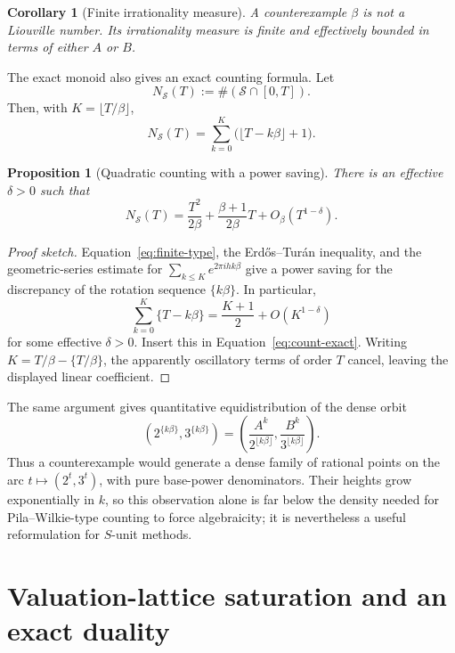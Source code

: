 \documentclass[11pt,oneside]{article}
\newtheorem{proposition}[theorem]{Proposition}
\newtheorem{corollary}[theorem]{Corollary}
\theoremstyle{definition}
\theoremstyle{remark}
\begin{document}
\begin{corollary}[Finite irrationality measure]\label{cor:finite-mu}
A counterexample $\beta$ is not a Liouville number.  Its irrationality measure
is finite and effectively bounded in terms of either $A$ or $B$.
\end{corollary}

The exact monoid also gives an exact counting formula.  Let
\[
  N_{\mathcal S}(T):=\#(\mathcal S\cap[0,T]).
\]
Then, with $K=\lfloor T/\beta\rfloor$,
\begin{equation}\label{eq:count-exact}
 N_{\mathcal S}(T)=\sum_{k=0}^{K}\bigl(\lfloor T-k\beta\rfloor+1\bigr).
\end{equation}

\begin{proposition}[Quadratic counting with a power saving]\label{prop:count}
There is an effective $\delta>0$ such that
\[
 N_{\mathcal S}(T)=\frac{T^2}{2\beta}
 +\frac{\beta+1}{2\beta}T+O_\beta(T^{1-\delta}).
\]
\end{proposition}
\begin{proof}[Proof sketch]
Equation~\eqref{eq:finite-type}, the Erd\H{o}s--Tur\'an inequality, and the
geometric-series estimate for $\sum_{k\le K}e^{2\pi i h k\beta}$ give a power
saving for the discrepancy of the rotation sequence $\{k\beta\}$.  In
particular,
\[
 \sum_{k=0}^{K}\{T-k\beta\}=\frac{K+1}{2}+O(K^{1-\delta})
\]
for some effective $\delta>0$.  Insert this in
Equation~\eqref{eq:count-exact}.  Writing $K=T/\beta-\{T/\beta\}$, the
apparently oscillatory terms of order $T$ cancel, leaving the displayed linear
coefficient.
\end{proof}

The same argument gives quantitative equidistribution of the dense orbit
\[
 \left(2^{\{k\beta\}},3^{\{k\beta\}}\right)
 =\left(\frac{A^k}{2^{\lfloor k\beta\rfloor}},
         \frac{B^k}{3^{\lfloor k\beta\rfloor}}\right).
\]
Thus a counterexample would generate a dense family of rational points on the
arc $t\mapsto(2^t,3^t)$, with pure base-power denominators.  Their heights grow
exponentially in $k$, so this observation alone is far below the density needed
for Pila--Wilkie-type counting to force algebraicity; it is nevertheless a
useful reformulation for $S$-unit methods.


\section{Valuation-lattice saturation and an exact duality}
\label{sec:saturation-duality}
\end{document}
